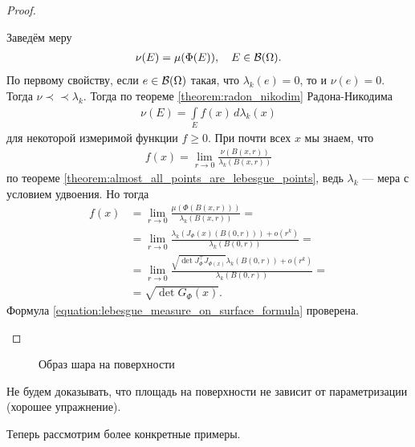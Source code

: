 \begin{proof}
\begin{enumerate}
  Заведём меру
  \begin{align*}
   \nu(E) = \mu(\Phi(E)), \quad E \in \mathcal{B}(\Omega)
  .\end{align*} По первому свойству, если $e \in \mathcal{B}(\Omega)$  такая, что $\lambda_k(e) = 0$, то и  $\nu(e) = 0$.  Тогда $\nu \prec \prec \lambda_k$. Тогда по теореме \ref{theorem:radon_nikodim} Радона-Никодима
  \begin{align*}
   \nu(E) = \int\limits_{E} f(x) \, d\lambda_k(x)  
  \end{align*} для некоторой измеримой функции $f \geqslant 0$. При почти всех $x$ мы знаем, что \begin{align*}
  f(x) = \lim_{r \to 0} \frac{\nu(B(x,r))}{\lambda_k(B(x,r))}
 \end{align*} по теореме \ref{theorem:almost_all_points_are_lebesgue_points}, ведь $\lambda_k$ --- мера с условием удвоения. Но тогда
 \begin{align*}
  f(x) &= \lim_{r \to 0}  \frac{\mu(\Phi(B(x,r)))}{\lambda_k(B(x,r))} = \\
  &= \lim_{r \to 0}  \frac{\lambda_k(J_{\Phi}(x)(B(0,r))) + o(r^{k})}{\lambda_k(B(0,r))} = \\
  &= \lim_{r \to 0} \frac{\sqrt{\det J_{\Phi}^{\top}J_{\Phi(x)}} \lambda_k(B(0,r)) + o(r^{k})}{\lambda_k(B(0,r))} = \\
  &= \sqrt{\det G_{\Phi}(x)}
 .\end{align*}  Формула \eqref{equation:lebesgue_measure_on_surface_formula} проверена.
\end{enumerate}
\end{proof}

\begin{figure}[ht]
    \centering
    \caption{Образ шара на поверхности}
    \label{fig:ball_image_on_surface}
\end{figure}

\begin{remrk*}
 Не будем доказывать, что площадь на поверхности не зависит от параметризации (хорошее упражнение).
\end{remrk*}

Теперь рассмотрим более конкретные примеры.

